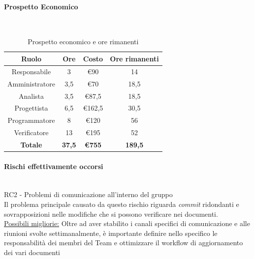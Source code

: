 \documentclass{article}
\begin{document}
                \paragraph{Prospetto Economico}\mbox{}\\
                \begin{table}[H]
                    \centering
                    \begin{tabular}{|c|c|c|c|}
                    \hline
                    \textbf{Ruolo}  & \textbf{Ore}  & \textbf{Costo} & \textbf{Ore rimanenti} \\ \hline
                    Responsabile    & 3             & €90            & 14                     \\ \hline
                    Amministratore  & 3,5           & €70            & 18,5                     \\ \hline
                    Analista        & 3,5           & €87,5          & 18,5                     \\ \hline
                    Progettista     & 6,5           & €162,5         & 30,5                     \\ \hline
                    Programmatore   & 8            & €120           & 56                     \\ \hline
                    Verificatore    & 13            & €195           & 52                     \\ \hline
                    \textbf{Totale} & \textbf{37,5} & \textbf{\euro755}   & \textbf{189,5}         \\ \hline
                    \end{tabular}
                    \caption{Prospetto economico e ore rimanenti}
                \end{table}


                \paragraph{Rischi effettivamente occorsi}\mbox{}\\
                RC2 - Problemi di comunicazione all’interno del gruppo \\
                Il problema principale causato da questo rischio riguarda \textit{commit} ridondanti e sovrapposizioni nelle modifiche che si possono verificare nei documenti. \\
                \underline{Possibili migliorie:} Oltre ad aver stabilito i canali specifici di comunicazione e alle riunioni svolte settimanalmente, è importante definire nello specifico le responsabilità dei membri del Team e ottimizzare il workflow di aggiornamento dei vari documenti
\end{document}
